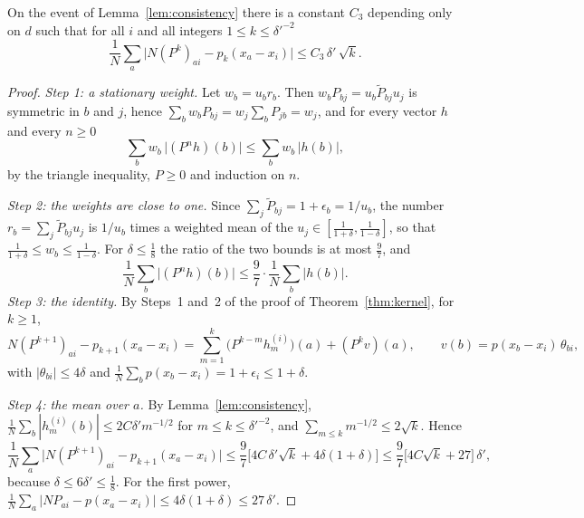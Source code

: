 
\begin{lemma}\label{lem:kernel-l1}
On the event of Lemma~\ref{lem:consistency} there is a constant $C_3$ depending only on $d$ such that for
all $i$ and all integers $1\le k\le\delta'^{-2}$
\[
 \frac1N\sum_a\big|N(P^k)_{ai}-p_k(x_a-x_i)\big|\le C_3\,\delta'\,\sqrt k .
\]
\end{lemma}

\begin{proof}
\emph{Step 1: a stationary weight.} Let $w_b=u_br_b$. Then $w_bP_{bj}=u_b\tilde P_{bj}u_j$ is symmetric in
$b$ and $j$, hence $\sum_bw_bP_{bj}=w_j\sum_bP_{jb}=w_j$, and for every vector $h$ and every $n\ge0$
\[
 \sum_bw_b\,\big|(P^nh)(b)\big|\le\sum_bw_b\,|h(b)| ,
\]
by the triangle inequality, $P\ge0$ and induction on $n$.

\emph{Step 2: the weights are close to one.} Since $\sum_j\tilde P_{bj}=1+\epsilon_b=1/u_b$, the number
$r_b=\sum_j\tilde P_{bj}u_j$ is $1/u_b$ times a weighted mean of the $u_j\in[\frac1{1+\delta},\frac1{1-\delta}]$, so
that $\frac1{1+\delta}\le w_b\le\frac1{1-\delta}$. For $\delta\le\frac18$ the ratio of the two bounds is at
most $\frac97$, and
\[
 \frac1N\sum_b\big|(P^nh)(b)\big|\le\frac97\cdot\frac1N\sum_b|h(b)| .
\]
\emph{Step 3: the identity.} By Steps~1 and~2 of the proof of Theorem~\ref{thm:kernel}, for $k\ge1$,
\[
 N(P^{k+1})_{ai}-p_{k+1}(x_a-x_i)=\sum_{m=1}^k\big(P^{k-m}h^{(i)}_m\big)(a)+(P^kv)(a),\qquad
 v(b)=p(x_b-x_i)\,\theta_{bi},
\]
with $|\theta_{bi}|\le4\delta$ and $\frac1N\sum_bp(x_b-x_i)=1+\epsilon_i\le1+\delta$.

\emph{Step 4: the mean over $a$.} By Lemma~\ref{lem:consistency},
$\frac1N\sum_b|h^{(i)}_m(b)|\le2C\delta'm^{-1/2}$ for $m\le k\le\delta'^{-2}$, and
$\sum_{m\le k}m^{-1/2}\le2\sqrt k$. Hence
\[
 \frac1N\sum_a\big|N(P^{k+1})_{ai}-p_{k+1}(x_a-x_i)\big|\le\frac97\Big[4C\,\delta'\sqrt k+4\delta(1+\delta)\Big]
 \le\frac97\big[4C\sqrt k+27\big]\,\delta' ,
\]
because $\delta\le6\delta'\le\frac18$. For the first power, $\frac1N\sum_a|NP_{ai}-p(x_a-x_i)|\le4\delta(1+\delta)\le27\,\delta'$.
\end{proof}

